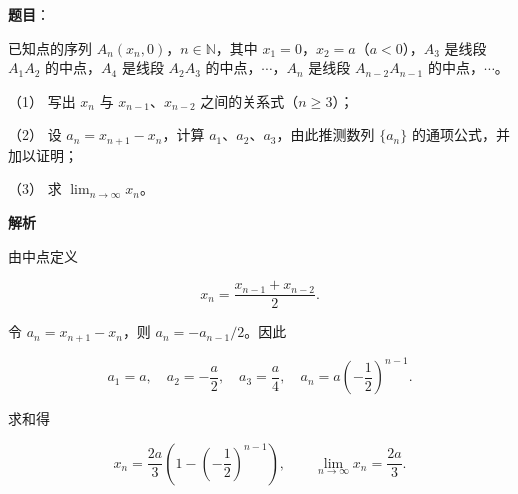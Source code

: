 \begin{answer}

\textbf{题目}：

已知点的序列 $A_n(x_n,0)$，$n\in\mathbb N$，其中 $x_1=0$，$x_2=a$（$a<0$），$A_3$ 是线段 $A_1A_2$ 的中点，$A_4$ 是线段 $A_2A_3$ 的中点，$\cdots$，$A_n$ 是线段 $A_{n-2}A_{n-1}$ 的中点，$\cdots$。

（1） 写出 $x_n$ 与 $x_{n-1}\text{、}x_{n-2}$ 之间的关系式（$n\ge3$）；

（2） 设 $a_n=x_{n+1}-x_n$，计算 $a_1\text{、}a_2\text{、}a_3$，由此推测数列 $\{a_n\}$ 的通项公式，并加以证明；

（3） 求 $\displaystyle\lim_{n\to\infty}x_n$。

\textbf{解析}


由中点定义

\nopagebreak[4]
\[
x_n=\frac{x_{n-1}+x_{n-2}}2.
\]


令 $a_n=x_{n+1}-x_n$，则 $a_n=-a_{n-1}/2$。因此

\nopagebreak[4]
\[
a_1=a,\quad a_2=-\frac a2,\quad a_3=\frac a4,\quad
a_n=a\left(-\frac12\right)^{n-1}.
\]


求和得

\nopagebreak[4]
\[
x_n=\frac{2a}{3}\left(1-\left(-\frac12\right)^{n-1}\right),
\qquad
\lim_{n\to\infty}x_n=\frac{2a}{3}.
\]




\end{answer}
